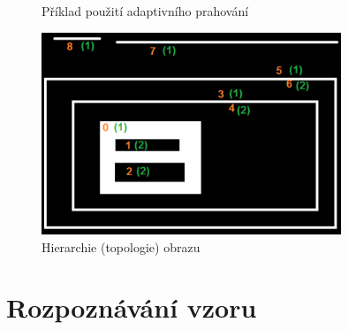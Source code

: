 \documentclass[twoside]{ctuthesis}
\theoremstyle{plain}
\theoremstyle{definition}
\theoremstyle{note}
\begin{document}
\begin{figure}
	\caption{Příklad použití adaptivního prahování \cite{cite:5}}

	\label{adapt}
	\hfill
\end{figure}

\begin{figure}

	\caption{Hierarchie (topologie) obrazu \cite{cite:6}}

	\label{hierarch}
	\includegraphics[width=0.8\textwidth]{images/2/ccomp_hierarchy.png}
\end{figure}

\section{Rozpoznávání vzoru}
\end{document}
